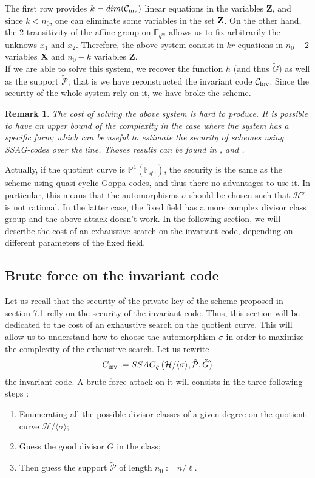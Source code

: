 \documentclass[10pt]{article}
\newtheorem{rq1}{Remark}[]
\newcommand{\s}{\vspace{0.3cm}}
\newcommand{\fqm}{\mathbb{F}_{q^m}}
\newcommand{\PR}{\mathcal{P}}
\begin{document}
The first row provides $k=dim(\mathcal{C}_{\rm{inv}})$ linear equations in the variables $\textbf{Z}$, and since $k < n_0$, one can eliminate some variables in the set $\bf{Z}$. On the other hand, the 2-transitivity of the affine group on $\fqm$ allows us to fix arbitrarily the unknows $x_1$ and $x_2$. Therefore, the above system consist in $kr$ equations in $n_0-2$ variables $\bf{X}$ and $n_0-k$ variables $\textbf{Z}$. \\
If we are able to solve this system, we recover the function $h$ (and thus $\tilde{G}$) as well as the support $\tilde{\PR}$; that is we have reconstructed the invariant code $\mathcal{C}_{\rm inv}$. Since the security of the whole system rely on it, we have broke the scheme.  

\s

\begin{rq1}
The cost of solving the above system is hard to produce. It is possible to have an upper bound of the complexity in the case where the system has a specific form; which can be useful to estimate the security of schemes using SSAG-codes over the line. Thoses results can be found in \cite{FOP}, \cite{FOP1} and \cite{FOP2}. 
\end{rq1}

Actually, if the quotient curve is $\mathbb{P}^1(\fqm)$, the security is the same as the scheme using quasi cyclic Goppa codes, and thus there no advantages to use it. In particular, this means that the automorphisms $\sigma$ should be chosen such that $\mathcal{H}^{\sigma}$ is not rational. In the latter case, the fixed field has a more complex divisor class group and the above attack doesn't work. In the following section, we will describe the cost of an exhaustive search on the invariant code, depending on different parameters of the fixed field.

\s

\subsection{Brute force on the invariant code}

\s

Let us recall that the security of the private key of the scheme proposed in section 7.1 relly on the security of the invariant code. Thus, this section will be dedicated to the cost of an exhaustive search on the quotient curve. This will allow us to understand how to choose the automorphism $\sigma$ in order to maximize the complexity of the exhaustive search. Let us rewrite 
\[C_{\rm inv} := SSAG_q\left(\mathcal{H}/\langle \sigma \rangle,\tilde{\PR},\tilde{G}\right)\]
the invariant code. A brute force attack on it will consists in the three following steps :
\begin{enumerate}
\item Enumerating all the possible divisor classes of a given degree on the quotient curve $\mathcal{H}/\langle \sigma \rangle$;
\item Guess the good divisor $\tilde{G}$ in the class;
\item Then guess the support $\tilde{\PR}$ of length $n_0:=n/\ell$.
\end{enumerate}
\end{document}
